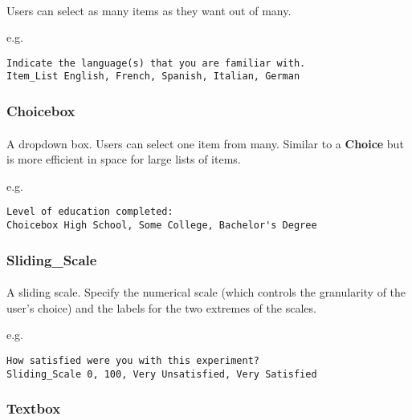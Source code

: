 \paragraph{}
Users can select as many items as they want out of many.

e.g.

\begin{lstlisting}
Indicate the language(s) that you are familiar with.
Item_List English, French, Spanish, Italian, German
\end{lstlisting}


\subsubsection{Choicebox}

\paragraph{}
A dropdown box.  Users can select one item from many.  Similar to a \textbf{Choice} but is more efficient in space for large lists of items.

e.g.

\begin{lstlisting}
Level of education completed:
Choicebox High School, Some College, Bachelor's Degree
\end{lstlisting}


\subsubsection{Sliding\_Scale}

\paragraph{}
A sliding scale.  Specify the numerical scale (which controls the granularity of the user's choice) and the labels for the two extremes of the scales.

e.g.

\begin{lstlisting}
How satisfied were you with this experiment?
Sliding_Scale 0, 100, Very Unsatisfied, Very Satisfied
\end{lstlisting}


\subsubsection{Textbox}

